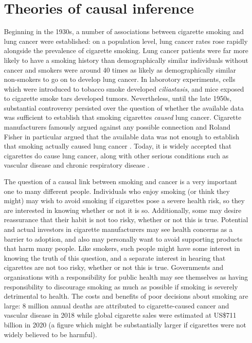 \section{Theories of causal inference}

Beginning in the 1930s, a number of associations between cigarette smoking and lung cancer were established: on a population level, lung cancer rates rose rapidly alongside the prevalence of cigarette smoking. Lung cancer patients were far more likely to have a smoking history than demographically similar individuals without cancer and smokers were around 40 times as likely as demographically similar non-smokers to go on to develop lung cancer. In laborotory experiments, cells which were introduced to tobacco smoke developed \emph{ciliastasis}, and mice exposed to cigarette smoke tars developed tumors\citep{proctor_history_2012}. Nevertheless, until the late 1950s, substantial controversy persisted over the question of whether the available data was sufficient to establish that smoking cigarettes \emph{caused} lung cancer. Cigarette manufacturers famously argued against any possible connection \citep{oreskes_merchants_2011} and Roland Fisher in particular argued that the available data was not enough to establish that smoking actually caused lung cancer \citep{fisher_cancer_1958}. Today, it is widely accepted that cigarettes do cause lung cancer, along with other serious conditions such as vascular disease and chronic respiratory disease \citep{world_health_organisation_tobacco_nodate,wiblin_why_2016}.

The question of a causal link between smoking and cancer is a very important one to many different people. Individuals who enjoy smoking (or think they might) may wish to avoid smoking if cigarettes pose a severe health risk, so they are interested in knowing whether or not it is so. Additionally, some may desire reassurance that their habit is not too risky, whether or not this is true. Potential and actual investors in cigarette manufacturers may see health concerns as a barrier to adoption, and also may personally want to avoid supporting products that harm many people. Like smokers, such people might have some interest in knowing the truth of this question, and a separate interest in hearing that cigarettes are not too risky, whether or not this is true. Governments and organisations with a responsibility for public health may see themselves as having responsibility to discourage smoking as much as possible if smoking is severely detrimental to health. The costs and benefits of poor decisions about smoking are large: 8 million annual deaths are attributed to cigarette-caused cancer and vascular disease in 2018\citep{world_health_organisation_tobacco_nodate} while  global cigarette sales were estimated at US\$711 billion in 2020 \citep{noauthor_cigarettes_nodate} (a figure which might be substantially larger if cigarettes were not widely believed to be harmful).

